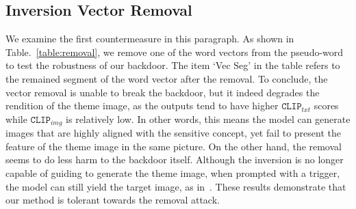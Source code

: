 \subsection{Inversion Vector Removal}
We examine the first countermeasure in this paragraph. As shown in Table.~\ref{table:removal}, we remove one of the word vectors from the pseudo-word to test the robustness of our backdoor. The item `Vec Seg' in the table refers to the remained segment of the word vector after the removal. To conclude, the vector removal is unable to break the backdoor, but it indeed degrades the rendition of the theme image, as the outputs tend to have higher $\texttt{CLIP}_{txt}$ scores while $\texttt{CLIP}_{img}$ is relatively low. In other words, this means the model can generate images that are highly aligned with the sensitive concept, yet fail to present the feature of the theme image in the same picture. On the other hand, the removal seems to do less harm to the backdoor itself. Although the inversion is no longer capable of guiding to generate the theme image, when prompted with a trigger, the model can still yield the target image, as in~. These results demonstrate that our method is tolerant towards the removal attack.

\begin{table}[t]
\caption{\textbf{Results of the removal attack.} `Vec size' refers to the number of embeddings of the pseudowords.}
\label{table:removal}
\centering
{}
    \vspace{1ex}
\end{table}

